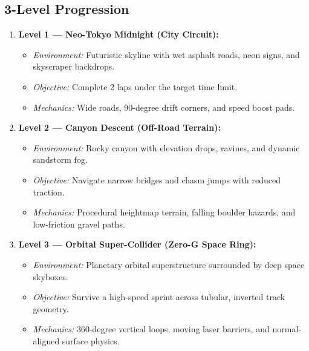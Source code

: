 \documentclass[11pt,a4paper]{article}
\begin{document}
\subsection{3-Level Progression}
\begin{enumerate}
    \item \textbf{Level 1 --- Neo-Tokyo Midnight (City Circuit):}
    \begin{itemize}
        \item \textit{Environment:} Futuristic skyline with wet asphalt roads, neon signs, and skyscraper backdrops.
        \item \textit{Objective:} Complete 2 laps under the target time limit.
        \item \textit{Mechanics:} Wide roads, 90-degree drift corners, and speed boost pads.
    \end{itemize}
    \item \textbf{Level 2 --- Canyon Descent (Off-Road Terrain):}
    \begin{itemize}
        \item \textit{Environment:} Rocky canyon with elevation drops, ravines, and dynamic sandstorm fog.
        \item \textit{Objective:} Navigate narrow bridges and chasm jumps with reduced traction.
        \item \textit{Mechanics:} Procedural heightmap terrain, falling boulder hazards, and low-friction gravel paths.
    \end{itemize}
    \item \textbf{Level 3 --- Orbital Super-Collider (Zero-G Space Ring):}
    \begin{itemize}
        \item \textit{Environment:} Planetary orbital superstructure surrounded by deep space skyboxes.
        \item \textit{Objective:} Survive a high-speed sprint across tubular, inverted track geometry.
        \item \textit{Mechanics:} 360-degree vertical loops, moving laser barriers, and normal-aligned surface physics.
    \end{itemize}
\end{enumerate}
\end{document}
